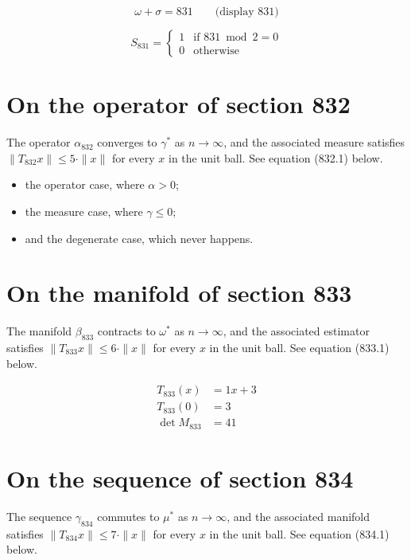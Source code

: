 \documentclass{article}
\begin{document}
$$
\omega + \sigma = 831 \qquad \text{(display 831)}
$$

\begin{equation}
S_{831} = \begin{cases} 1 & \text{if } 831 \bmod 2 = 0 \\ 0 & \text{otherwise} \end{cases}
\end{equation}

\section{On the operator of section 832}
The operator $\alpha_{832}$ converges to $\gamma^{*}$ as $n \to \infty$,
and the associated measure satisfies $\|T_{832} x\| \leq 5 \cdot \|x\|$
for every $x$ in the unit ball. See equation (832.1) below.

\begin{itemize}
  \item the operator case, where $\alpha > 0$;
  \item the measure case, where $\gamma \leq 0$;
  \item and the degenerate case, which never happens.
\end{itemize}

\section{On the manifold of section 833}
The manifold $\beta_{833}$ contracts to $\omega^{*}$ as $n \to \infty$,
and the associated estimator satisfies $\|T_{833} x\| \leq 6 \cdot \|x\|$
for every $x$ in the unit ball. See equation (833.1) below.

\begin{align}
T_{833}(x) &= 1 x + 3 \\
T_{833}(0) &= 3 \\
\det M_{833} &= 41
\end{align}

\section{On the sequence of section 834}
The sequence $\gamma_{834}$ commutes to $\mu^{*}$ as $n \to \infty$,
and the associated manifold satisfies $\|T_{834} x\| \leq 7 \cdot \|x\|$
for every $x$ in the unit ball. See equation (834.1) below.
\end{document}

